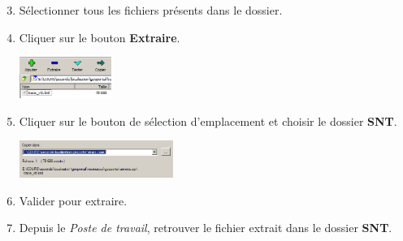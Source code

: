 \documentclass[svgnames,11pt]{beamer}
\begin{document}
\begin{frame}
    \frametitle{}
\setcounter{compteuractivite}{8}
    \begin{activite}
    \begin{enumerate}
        \setcounter{enumi}{2}
        \item Sélectionner tous les fichiers présents dans le dossier.
        \item Cliquer sur le bouton \textbf{Extraire}.
        \begin{center}
        \centering
        \includegraphics[width=3cm]{ressources/extraire.PNG}
        \end{center}
        \item Cliquer sur le bouton de sélection d'emplacement et choisir le dossier \textbf{SNT}.
        \begin{center}
        \centering
        \includegraphics[width=5cm]{ressources/extraire2.PNG}
        \label{IMG}
        \end{center}
        \item Valider pour extraire.
        \item Depuis le \emph{Poste de travail}, retrouver le fichier extrait dans le dossier \textbf{SNT}.
    \end{enumerate}
    \end{activite}

\end{frame}
\end{document}
